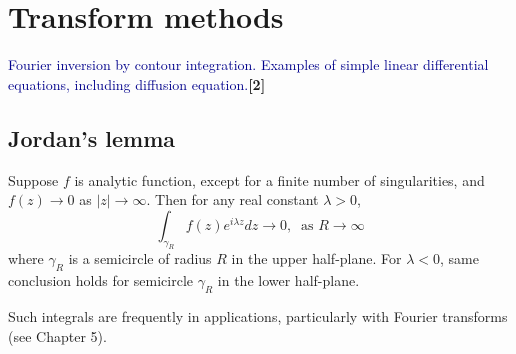\documentclass[a4paper]{article}
\begin{document}
\section{Transform methods}
{\small\textcolor{darkblue}{Fourier inversion by contour integration. Examples of simple linear differential equations, including diffusion equation.}\hfill\textbf{[2]}}
\subsection{Jordan's lemma}
\begin{lemma}
Suppose $f$ is analytic function, except for a finite number of singularities, and $f(z)\rightarrow 0$ as $|z|\rightarrow\infty$. Then for any real constant $\lambda>0$,
$$\int_{\gamma_R}f(z)e^{i\lambda z}dz\rightarrow 0,~\text{ as }R\rightarrow\infty$$
where $\gamma_R$ is a semicircle of radius $R$ in the upper half-plane. For $\lambda<0$, same conclusion holds for semicircle $\gamma_R$ in the lower half-plane.
\begin{center}
  \end{center}
\end{lemma}
Such integrals are frequently in applications, particularly with Fourier transforms (see Chapter 5).
\end{document}
